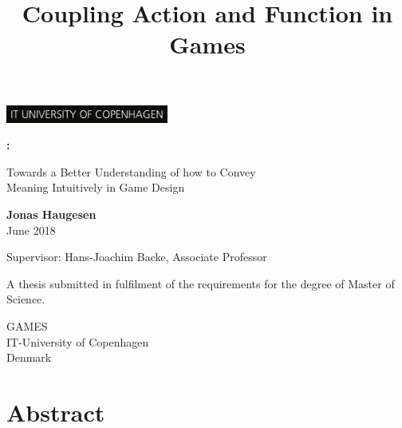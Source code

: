 \documentclass[twoside]{article}
\title{Coupling Action and Function in Games}
\begin{document}
\begin{titlepage}

  \begin{flushright}
    \includegraphics[width=0.4\textwidth]{ITU_logo}
  \end{flushright}

  \begin{center}

          \vspace*{1cm}

          \Huge\textbf{\thetitle:}

          \vspace{0.5cm}
          \Large Towards a Better Understanding of how to Convey \\
            Meaning Intuitively in Game Design

          \vspace{1.5cm}

          \large
          \textbf{Jonas Haugesen} \\
          \vspace{0.4cm}
          June 2018
          \vfill

          Supervisor: Hans-Joachim Backe, Associate Professor\\

          \vspace{0.4cm}

          A thesis submitted in fulfilment of the requirements
          for the degree of Master of Science.

          \vspace{0.8cm}

          GAMES\\
          IT-University of Copenhagen\\
          Denmark\\
          \vspace{2cm}

      \end{center}
\end{titlepage}

\chapter*{Abstract}










\newpage


\appendix

\end{document}

